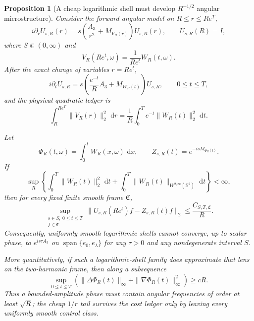 \documentclass[11pt]{article}
\newtheorem{proposition}[theorem]{Proposition}
\theoremstyle{remark}
\newcommand{\dd}{\,\mathrm d}
\begin{document}
\begin{proposition}[A cheap logarithmic shell must develop
$R^{-1/2}$ angular microstructure]
\label{prop:log-shell-microstructure}
Consider the forward angular model on
$R\leq r\leq Re^T$,
\begin{equation}
 i\partial_rU_{s,R}(r)
 =
 s\left(\frac{A_3}{r^2}+M_{V_R(r)}\right)U_{s,R}(r),
 \qquad U_{s,R}(R)=I,
 \label{eq:log-shell-forward-model}
\end{equation}
where $S\Subset(0,\infty)$ and
\[
 V_R(Re^t,\omega)=\frac{1}{Re^t}W_R(t,\omega).
\]
After the exact change of variables $r=Re^t$,
\begin{equation}
 i\partial_tU_{s,R}
 =
 s\left(\frac{e^{-t}}{R}A_3+M_{W_R(t)}\right)U_{s,R},
 \qquad 0\leq t\leq T,
 \label{eq:log-shell-rescaled-model}
\end{equation}
and the physical quadratic ledger is
\begin{equation}
 \int_R^{Re^T}\|V_R(r)\|_2^2\,\dd r
 =
 \frac1R\int_0^Te^{-t}\|W_R(t)\|_2^2\,\dd t.
 \label{eq:log-shell-cost}
\end{equation}

Let
\[
 \Phi_R(t,\omega)=\int_0^tW_R(x,\omega)\,\dd x,
 \qquad
 Z_{s,R}(t)=e^{-isM_{\Phi_R(t)}}.
\]
If
\begin{equation}
 \sup_R\left\{
 \int_0^T\|W_R(t)\|_2^2\,\dd t+
 \int_0^T\|W_R(t)\|_{W^{2,\infty}(\mathbb S^2)}\,\dd t
 \right\}<\infty,
 \label{eq:log-shell-smoothness}
\end{equation}
then for every fixed finite smooth frame $\mathfrak C$,
\begin{equation}
 \sup_{\substack{s\in S,\ 0\leq t\leq T\\f\in\mathfrak C}}
 \|U_{s,R}(Re^t)f-Z_{s,R}(t)f\|_2
 \leq \frac{C_{S,T,\mathfrak C}}{R}.
 \label{eq:log-shell-multiplier-limit}
\end{equation}
Consequently, uniformly smooth logarithmic shells cannot converge, up to
scalar phase, to $e^{is\tau A_3}$ on
$\operatorname{span}\{e_0,e_\lambda\}$ for any $\tau>0$ and any
nondegenerate interval $S$.

More quantitatively, if such a logarithmic-shell family does approximate that
lens on the two-harmonic frame, then along a subsequence
\begin{equation}
 \sup_{0\leq t\leq T}
 \left(
  \|\Delta\Phi_R(t)\|_\infty+
  \|\nabla\Phi_R(t)\|_\infty^2
 \right)
 \geq cR.
 \label{eq:log-shell-microstructure-necessity}
\end{equation}
Thus a bounded-amplitude phase must contain angular frequencies of order at
least $\sqrt R$; the cheap $1/r$ tail survives the cost ledger only by leaving
every uniformly smooth control class.
\end{proposition}
\end{document}

